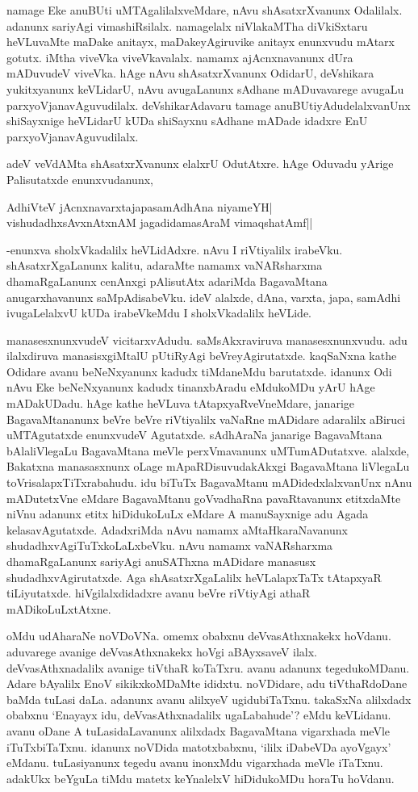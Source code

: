 namage Eke anuBUti uMTAgalilalxveMdare, nAvu shAsatxrXvanunx Odalilalx. adanunx sariyAgi vimashiRsilalx. namagelalx niVlakaMTha diVkiSxtaru heVLuvaMte maDake anitayx, maDakeyAgiruvike anitayx enunxvudu mAtarx gotutx. iMtha viveVka viveVkavalalx. namamx ajAcnxnavanunx dUra mADuvudeV viveVka. hAge nAvu shAsatxrXvanunx OdidarU, deVshikara yukitxyanunx keVLidarU, nAvu avugaLanunx sAdhane mADuvavarege avugaLu parxyoVjanavAguvudilalx. deVshikarAdavaru tamage anuBUtiyAdudelalxvanUnx shiSayxnige heVLidarU kUDa shiSayxnu sAdhane mADade idadxre EnU parxyoVjanavAguvudilalx.

adeV veVdAMta shAsatxrXvanunx elalxrU OdutAtxre. hAge Oduvadu yArige Palisutatxde enunxvudanunx,

\begin{shloka}
AdhiVteV jAcnxnavarxtajapasamAdhAna niyameYH|\\
vishudadhxsAvxnAtxnAM jagadidamasAraM vimaqshatAmf||
\end{shloka}

-enunxva sholxVkadalilx heVLidAdxre. nAvu I riVtiyalilx irabeVku. shAsatxrXgaLanunx kalitu, adaraMte namamx vaNARsharxma dhamaRgaLanunx cenAnxgi pAlisutAtx adariMda BagavaMtana anugarxhavanunx saMpAdisabeVku. ideV alalxde, dAna, varxta, japa, samAdhi ivugaLelalxvU kUDa irabeVkeMdu I sholxVkadalilx heVLide.

manasesxnunxvudeV vicitarxvAdudu. saMsAkxraviruva manasesxnunxvudu. adu ilalxdiruva manasisxgiMtalU pUtiRyAgi beVreyAgirutatxde. kaqSaNxna kathe Odidare avanu beNeNxyanunx kadudx tiMdaneMdu barutatxde. idanunx Odi nAvu Eke beNeNxyanunx kadudx tinanxbAradu eMdukoMDu yArU hAge mADakUDadu. hAge kathe heVLuva tAtapxyaRveVneMdare, janarige BagavaMtananunx beVre beVre riVtiyalilx vaNaRne mADidare adaralilx aBiruci uMTAgutatxde enunxvudeV Agutatxde. sAdhAraNa janarige BagavaMtana bAlaliVlegaLu BagavaMtana meVle perxVmavanunx uMTumADutatxve. alalxde, Bakatxna manasasxnunx oLage mApaRDisuvudakAkxgi BagavaMtana liVlegaLu toVrisalapxTiTxrabahudu. idu biTuTx BagavaMtanu mADidedxlalxvanUnx nAnu mADutetxVne eMdare BagavaMtanu goVvadhaRna pavaRtavanunx etitxdaMte niVnu adanunx etitx hiDidukoLuLx eMdare A manuSayxnige adu Agada kelasavAgutatxde. AdadxriMda nAvu namamx aMtaHkaraNavanunx shudadhxvAgiTuTxkoLaLxbeVku. nAvu namamx vaNARsharxma dhamaRgaLanunx sariyAgi anuSAThxna mADidare manasusx shudadhxvAgirutatxde. Aga shAsatxrXgaLalilx heVLalapxTaTx tAtapxyaR tiLiyutatxde. hiVgilalxdidadxre avanu beVre riVtiyAgi athaR mADikoLuLxtAtxne.

oMdu udAharaNe noVDoVNa. omemx obabxnu deVvasAthxnakekx hoVdanu. aduvarege avanige deVvasAthxnakekx hoVgi aBAyxsaveV ilalx. deVvasAthxnadalilx avanige tiVthaR koTaTxru. avanu adanunx tegedukoMDanu. Adare bAyalilx EnoV sikikxkoMDaMte ididxtu. noVDidare, adu tiVthaRdoDane baMda tuLasi daLa. adanunx avanu alilxyeV ugidubiTaTxnu. takaSxNa alilxdadx obabxnu `Enayayx idu, deVvasAthxnadalilx ugaLabahude'? eMdu keVLidanu. avanu oDane A tuLasidaLavanunx alilxdadx BagavaMtana vigarxhada meVle iTuTxbiTaTxnu. idanunx noVDida matotxbabxnu, `ililx iDabeVDa ayoVgayx' eMdanu. tuLasiyanunx tegedu avanu inonxMdu vigarxhada meVle iTaTxnu. adakUkx beYguLa tiMdu matetx keYnalelxV hiDidukoMDu horaTu hoVdanu.

